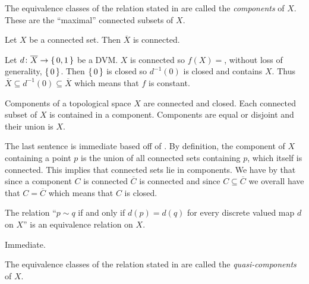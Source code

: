 \documentclass[letterpaper, 11pt, oneside]{book}
\begin{document}
\begin{defn}[Components]
  The equivalence classes of the relation stated in  are called the \emph{components} of $X$.
  These are the ``maximal'' connected subsets of $X$.
\end{defn}


\begin{lem}\label{lem: closure_of_connected_is_connected}
  Let $X$ be a connected set.
  Then $\overline{X}$ is connected.
\end{lem}
\begin{pf}
  Let $d\colon \overline{X} \to \set{0, 1}$ be a DVM.\@
  $X$ is connected so $f(X) =$, without loss of generality, $\set{0}$.
  Then $\set{0}$ is closed so $d^{-1}(0)$ is closed and contains $X$.
  Thus $\overline{X} \subseteq d^{-1}(0) \subseteq \overline{X}$ which means that $f$ is constant.
\end{pf}

\begin{prop}
  Components of a topological space $X$ are connected and closed.
  Each connected subset of $X$ is contained in a component.
  Components are equal or disjoint and their union is $X$.
\end{prop}
\begin{pf}
  The last sentence is immediate based off of .
  By definition, the component of $X$ containing a point $p$ is the union of all connected sets containing $p$, which itself is connected.
  This implies that connected sets lie in components.
  We have by  that since a component $C$ is connected $\overline{C}$ is connected and since $C \subseteq \overline{C}$ we overall have that $C = \overline{C}$ which means that $C$ is closed.
\end{pf}

\begin{prop}\label{prop: dvm_eq_rel}
  The relation ``$p \sim q$ if and only if $d(p) = d(q)$ for every discrete valued map $d$ on $X$'' is an equivalence relation on $X$.
\end{prop}
\begin{pf}
  Immediate.
\end{pf}

\begin{defn}
  The equivalence classes of the relation stated in  are called the \emph{quasi-components} of $X$.
\end{defn}
\end{document}
